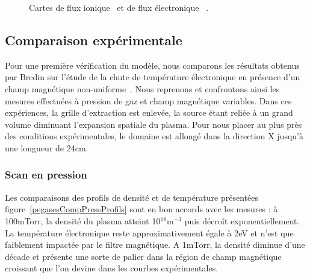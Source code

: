 \begin{refsection}
\begin{figure}[htbp]
  \centering
    \caption{Cartes de flux ionique ~et de flux
    électronique ~.}
    \label{4-PegasesCarteFlux}
\end{figure}

\subsection{Comparaison expérimentale}
Pour une première vérification du modèle, nous
comparons les résultats obtenus par Bredin sur l'étude de la
chute de température électronique en présence d'un champ magnétique
non-uniforme~\parencite{Bredin}. Nous reprenons et confrontons ainsi les mesures
effectuées à pression de gaz et champ magnétique variables. Dans ces expériences, la grille
d'extraction est enlevée, la source étant reliée à un grand volume diminuant
l'expansion spatiale du plasma. Pour nous placer au plus près des conditions
expérimentales, le domaine est allongé dans la direction X jusqu'à une longueur
de 24cm.
	
	\subsubsection{Scan en pression}
	Les comparaisons des profils de densité et de température présentées
	figure~\ref{pegasesCompPressProfils} sont en bon accords avec les mesures : à
	100mTorr, la densité du plasma atteint 10$^{18}\text{m}^{-3}$ puis décroît
	exponentiellement. La température électronique reste approximativement égale à
	2eV et n'est que faiblement impactée par le filtre magnétique. A 1mTorr, la
	densité diminue d'une décade et présente une sorte de palier dans la région de
	champ magnétique croissant que l'on devine dans les courbes expérimentales.
	

\end{refsection}
